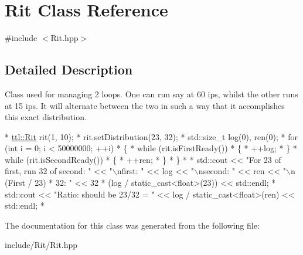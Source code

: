 \hypertarget{class_rit}{\section{Rit Class Reference}
\label{class_rit}
}


{\ttfamily \#include $<$Rit.\-hpp$>$}



\subsection{Detailed Description}
Class used for managing 2 loops. One can run say at 60 ips, whilst the other runs at 15 ips. It will alternate between the two in such a way that it accomplishes this exact distribution.


\begin{DoxyCode}
*  \hyperlink{classttl_1_1_rit}{ttl::Rit} rit(1, 10);
*  rit.setDistribution(23, 32);
*  std::size\_t log(0), ren(0);
*  \textcolor{keywordflow}{for} (\textcolor{keywordtype}{int} i = 0; i < 50000000; ++i)
*  \{
*      \textcolor{keywordflow}{while} (rit.isFirstReady())
*      \{
*          ++log;
*      \}
*      \textcolor{keywordflow}{while} (rit.isSecondReady())
*      \{
*          ++ren;
*      \}
*  \}
* 
*  std::cout << \textcolor{stringliteral}{"For 23 of first, run 32 of second: "} << \textcolor{stringliteral}{"\(\backslash\)nfirst: "} << log << \textcolor{stringliteral}{"\(\backslash\)nsecond: "} << ren << \textcolor{stringliteral}{"\(\backslash\)n
      (First / 23) * 32: "} << 32 * (log / \textcolor{keyword}{static\_cast<}\textcolor{keywordtype}{float}\textcolor{keyword}{>}(23)) << std::endl;
*  std::cout << \textcolor{stringliteral}{"Ratio: should be 23/32 = "} << log / \textcolor{keyword}{static\_cast<}\textcolor{keywordtype}{float}\textcolor{keyword}{>}(ren) << std::endl;
*  
\end{DoxyCode}
 

The documentation for this class was generated from the following file\-:\begin{DoxyCompactItemize}
\item 
include/\-Rit/Rit.\-hpp\end{DoxyCompactItemize}
